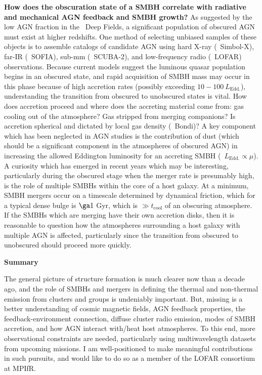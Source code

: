 \documentclass[11pt]{article}
\begin{document}
{\bf{How does the obscuration state of a SMBH correlate with radiative
    and mechanical AGN feedback and SMBH growth?}} As suggested by the
low AGN fraction in the \chandra\ Deep Fields, a significant
population of obscured AGN must exist at higher redshifts. One method
of selecting unbiased samples of these objects is to assemble catalogs
of candidate AGN using hard X-ray (\ie\ Simbol-X), far-IR
(\ie\ SOFIA), sub-mm (\ie\ SCUBA-2), and low-frequency radio
(\ie\ LOFAR) observations. Because current models suggest the luminous
quasar population begins in an obscured state, and rapid acquisition
of SMBH mass may occur in this phase because of high accretion rates
(possibly exceeding $10-100~L_{\mathrm{Edd.}}$), understanding the
transition from obscured to unobscured states is vital. How does
accretion proceed and where does the accreting material come from: gas
cooling out of the atmosphere? Gas stripped from merging companions?
Is accretion spherical and dictated by local gas density (\eg\ Bondi)?
A key component which has been neglected in AGN studies is the
contribution of dust (which should be a significant component in the
atmospheres of obscured AGN) in increasing the allowed Eddington
luminosity for an accreting SMBH (\ie\ $L_{\mathrm{Edd.}} \propto
\mu$). A curiosity which has emerged in recent years which may be
interesting, particularly during the obscured stage when the merger
rate is presumably high, is the role of multiple SMBHs within the core
of a host galaxy. At a minimum, SMBH mergers occur on a timescale
determined by dynamical friction, which for a typical dense bulge is
$\ga 1$ Gyr, which is $\gg t_{\mathrm{cool}}$ of an obscuring
atmosphere. If the SMBHs which are merging have their own accretion
disks, then it is reasonable to question how the atmospheres
surrounding a host galaxy with multiple AGN is affected, particularly
since the transition from obscured to unobscured should proceed more
quickly.

{\bf{Summary}}


The general picture of structure formation is much clearer now than a
decade ago, and the role of SMBHs and mergers in defining the thermal
and non-thermal emission from clusters and groups is undeniably
important. But, missing is a better understanding of cosmic magnetic
fields, AGN feedback properties, the feedback-environment connection,
diffuse cluster radio emission, modes of SMBH accretion, and how AGN
interact with/heat host atmospheres. To this end, more observational
constraints are needed, particularly using multiwavelength datasets
from upcoming missions. I am well-positioned to make meaningful
contributions in such pursuits, and would like to do so as a member of
the LOFAR consortium at MPIfR.

\scriptsize


 
\end{document}
